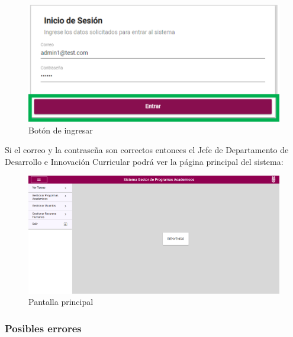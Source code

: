         \begin{figure}[H]
            \centering
            \hypertarget{BotonIng}{\includegraphics[width=0.5\linewidth]{images/SP5/BotonIngresar}}
            \caption{Botón de ingresar}
        \end{figure}

        Si el correo y la contraseña son correctos entonces el Jefe de Departamento de Desarrollo e Innovación Curricular podrá ver la página principal del sistema:

        \begin{figure}[H]
            \centering
            \hypertarget{Principal}{\includegraphics[width=0.7\linewidth]{images/SP5/Principal}}
            \caption{Pantalla principal}
        \end{figure}

        \clearpage
        \subsubsection{Posibles errores}

